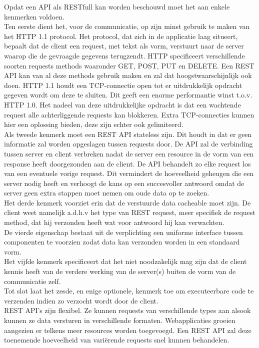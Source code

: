 Opdat een API als RESTfull kan worden beschouwd moet het aan enkele kenmerken voldoen.\\
Ten eerste dient het, voor de communicatie, op zijn minst gebruik te maken van het HTTP 1.1 protocol. Het protocol, dat zich in de applicatie laag situeert,
bepaalt dat de client een request, met tekst als vorm, verstuurt naar de server waarop die de gevraagde gegevens terugzendt.
HTTP specificeert verschillende soorten requests methods waaronder GET, POST, PUT en DELETE. Een REST API kan van al deze methods gebruik maken en zal dat
hoogstwaarschijnlijk ook doen. HTTP 1.1 houdt een TCP-connectie open tot er uitdrukkelijk opdracht gegeven wordt om deze te sluiten.
Dit geeft een enorme performantie winst t.o.v. HTTP 1.0. Het nadeel van deze uitdrukkelijke opdracht is dat een wachtende request alle achterliggende requests kan blokkeren.
Extra TCP-connecties kunnen hier een oplossing bieden, deze zijn echter ook gelimiteerd.
~\autocite{w3Protocol}\\
Als tweede kenmerk moet een REST API stateless zijn. Dit houdt in dat er geen informatie zal worden opgeslagen tussen requests door.
De API zal de verbinding tussen server en client verbreken nadat de server een resource in de vorm van een response heeft doorgezonden aan de client.
De API behandelt zo elke request los van een eventuele vorige request. Dit vermindert de hoeveelheid geheugen die een server nodig heeft en verhoogt de
kans op een succesvoller antwoord omdat de server geen extra stappen moet nemen om oude data op te zoeken.\\
Het derde kenmerk voorziet erin dat de verstuurde data cacheable moet zijn. De client weet namelijk a.d.h.v het type van REST request,
meer specifiek de request method, dat hij verzonden heeft wat voor antwoord hij kan verwachten.\\
De vierde eigenschap bestaat uit de verplichting een uniforme interface tussen componenten te voorzien zodat data kan verzonden worden in een standaard vorm.\\
Het vijfde kenmerk specificeert dat het niet noodzakelijk mag zijn dat de client kennis heeft van de verdere werking van de server(s) buiten de vorm van de communicatie zelf.\\
Tot slot laat het zesde, en enige optionele, kenmerk toe om executeerbare code te verzenden indien zo verzocht wordt door de client.
~\autocite{redhat}\\

REST API's zijn flexibel. Ze kunnen requests van verschillende types aan alsook kunnen ze data versturen in verschillende formaten.
Webapplicaties groeien aangezien er telkens meer resources worden toegevoegd. Een REST API zal deze toenemende hoeveelheid van vari\"erende requests snel kunnen behandelen.\\

